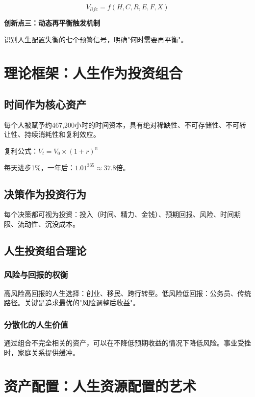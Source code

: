 \documentclass[12pt,a4paper]{article}
\begin{document}
$$V_{life} = f(H, C, R, E, F, X)$$

\textbf{创新点三：动态再平衡触发机制}

识别人生配置失衡的七个预警信号，明确"何时需要再平衡"。

\section{理论框架：人生作为投资组合}

\subsection{时间作为核心资产}

每个人被赋予约467,200小时的时间资本，具有绝对稀缺性、不可存储性、不可转让性、持续消耗性和复利效应。

复利公式：$V_t = V_0 \times (1 + r)^n$

每天进步1\%，一年后：$1.01^{365} \approx 37.8$倍。

\subsection{决策作为投资行为}

每个决策都可视为投资：投入（时间、精力、金钱）、预期回报、风险、时间期限、流动性、沉没成本。

\subsection{人生投资组合理论}

\subsubsection{风险与回报的权衡}

高风险高回报的人生选择：创业、移民、跨行转型。低风险低回报：公务员、传统路径。关键是追求最优的"风险调整后收益"。

\subsubsection{分散化的人生价值}

通过组合不完全相关的资产，可以在不降低预期收益的情况下降低风险。事业受挫时，家庭关系提供缓冲。

\section{资产配置：人生资源配置的艺术}
\end{document}
